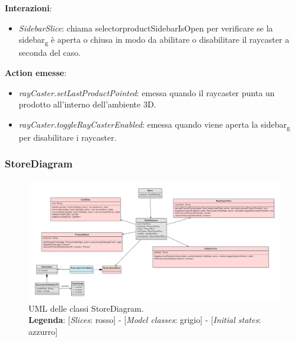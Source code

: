 \begin{itemize}
		\textbf{Interazioni}:
		\begin{itemize}
			\item \textit{SidebarSlice}: chiama selectorproductSidebarIsOpen per verificare se la sidebar\textsubscript{g}
			è aperta o chiusa in modo da abilitare o disabilitare il raycaster a seconda del caso.
		\end{itemize}
		\textbf{Action emesse}:
		\begin{itemize}
			\item \textit{rayCaster.setLastProductPointed}: emessa quando il raycaster punta un prodotto all'interno dell'ambiente 3D.
			\item \textit{rayCaster.toggleRayCasterEnabled}: emessa quando viene aperta la sidebar\textsubscript{g} per disabilitare i raycaster.
		\end{itemize}
\end{itemize}


\begin{landscape}
\thispagestyle{empty}
\subsubsection{StoreDiagram}
\begin{figure}[H]
	\centering
	\includegraphics[scale=0.65, keepaspectratio]{./res/images/storeDiagram.PNG}
	\caption[UML delle classi StoreDiagram]{
	UML delle classi StoreDiagram.
	\\
	\textbf{Legenda}: 
	[\textit{Slices}: rosso] -
	[\textit{Model classes}: grigio] -
	[\textit{Initial states}: azzurro]}
\end{figure}
\end{landscape}
\restoregeometry
